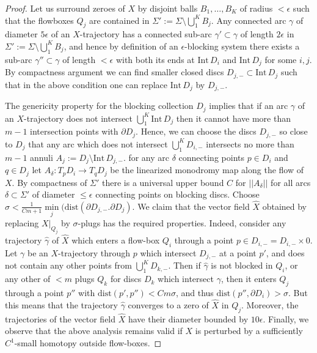 \documentclass[12pt]{amsart}
\theoremstyle{plain}
\theoremstyle{definition}
\theoremstyle{remark}
\newcommand{\eps}{\epsilon}
\newcommand{\p}{\partial}
\newcommand{\wh}{\widehat}
\newcommand{\Int}{\mathrm{Int\,}}
\newcommand{\dist}{\mathrm{dist}}
\begin{document}
 

 \begin{proof} 
Let us surround zeroes of $X$ by disjoint  balls $B_1, \dots, B_K$  of radius $<\eps$ such that the flowboxes $Q_j$ are contained in $\Sigma':=\Sigma\setminus\bigcup\limits_1^K B_j$. Any connected arc $\gamma$ of diameter $5\eps$ of an $X$-trajectory has a connected sub-arc $\gamma'\subset \gamma$ of length $2\eps$ in  $\Sigma':=\Sigma\setminus\bigcup\limits_1^K B_j$, and hence by definition of an $\eps$-blocking system there exists a sub-arc $\gamma''\subset\gamma$ of length $<\eps$ with  both its ends at
   $\Int D_i$ and $\Int D_j$ for some  $i,j$.
    By compactness argument we can find smaller closed discs $D_{j,-}\subset \Int D_j$ such that in  the above condition one can replace   $\Int D_j$  by  $D_{j,-}$.
 
 The genericity  property for the blocking collection $D_j$ implies that if  an  arc $\gamma$ of an $X$-trajectory does not intersect $\bigcup\limits_1^K \Int D_{j}$ then it cannot have more than $m-1$ intersection points with $\p D_j$. Hence, we can choose the discs    $D_{j,-}$ so close to $D_j$ that any arc    which does not intersect
 $\bigcup\limits_1^K D_{i,-}$ intersects no more than $m-1$ annuli $A_j:=D_j\setminus\Int D_{j,-}$. 
 for any arc $\delta$    connecting points $p\in D_i$ and $q\in D_j$ let $A_\delta:T_pD_i\to T_q D_j$ be the linearized monodromy map along the flow of $X$. By compactness of $\Sigma'$  there is a universal upper bound $C$ for $||A_\delta||$ for  all arcs $\delta\subset\Sigma'$ of diameter $\leq\eps$ connecting points on blocking discs.
  Choose $\sigma<\frac1{Cm+1}\min\limits_j(\dist(\p D_{j,-}.\p D_j)$. We claim that the vector field $\wh X$ obtained by replacing $X|_{Q_j}$ by $\sigma$-plugs has the required properties. Indeed,  consider any trajectory  $\wh\gamma$ of $\wh X$ which enters a flow-box $Q_i$ through  a point $p\in  D_{i,-}=D_{i,-}\times 0$. Let $\gamma$ be an $X$-trajectory through $p$ which intersect $D_{j,-}$ at a point $p'$, and  does not contain  any other points from  $\bigcup\limits_1^K D_{k,-}$. Then if $\wh\gamma$ is not blocked in $Q_i$, or any other of $<m$ plugs $Q_{k}$ for discs $D_{k}$ which intersect  $\gamma$, then it enters $Q_j$ through a point $p''$ with $\dist(p',p'')< Cm\sigma$, and thus $\dist(p'',\p D_i)>\sigma$. But this   means that the trajectory $\wh\gamma$ converges to a   zero of $\wh X$ in $Q_j$.  Moreover,  the trajectories of  the vector  field $\wh X$  have their diameter bounded by $10\eps$. Finally, we observe that the above analysis remains valid if   $X$ is  perturbed  by a sufficiently $C^1$-small homotopy outside flow-boxes.
 
   
   \end{proof}
 
\end{document}
